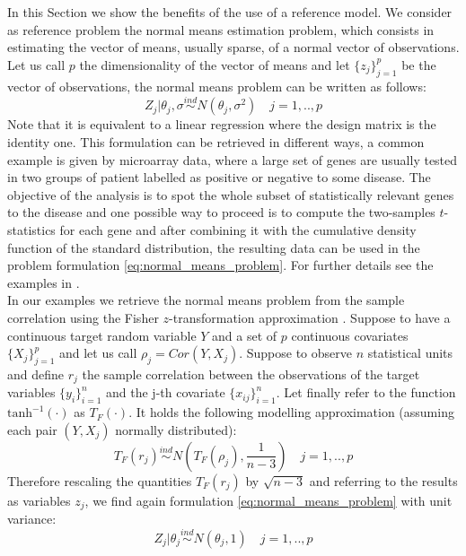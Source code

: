\documentclass[american,]{article}
\theoremstyle{definition}
\begin{document}
In this Section we show the benefits of the use of a reference model. We consider as reference problem the normal means estimation problem, which consists in estimating the vector of means, usually sparse, of a normal vector of observations. Let us call $p$ the dimensionality of the vector of means and let $\{z_{j}\}_{j=1}^{p}$ be the vector of observations, the normal means problem can be written as follows:
\
\begin{equation}\label{eq:normal_means_problem}
Z_{j}|\theta_{j},\sigma\overset{ind}{\sim}N(\theta_{j},\sigma^{2}) \quad j=1,..,p
\end{equation}
Note that it is equivalent to a linear regression where the design matrix is the identity one. This formulation can be retrieved in different ways, a common example is given by microarray data, where a large set of genes are usually tested in two groups of patient labelled as positive or negative to some disease. The objective of the analysis is to spot the whole subset of statistically relevant genes to the disease and one possible way to proceed is to compute the two-samples $t$-statistics for each gene and after combining it with the cumulative density function of the standard distribution, the resulting data can be used in the problem formulation \eqref{eq:normal_means_problem}. For further details see the examples in \cite{paper:efron, book:efron}. 
\\
In our examples we retrieve the normal means problem from the sample correlation using the Fisher $z$-transformation approximation \citep{paper:hawkins}. Suppose to have a continuous target random variable $Y$ and a set of $p$ continuous covariates $\{X_{j}\}_{j=1}^{p}$ and let us call $\rho_{j}=Cor(Y,X_{j})$. Suppose to observe $n$ statistical units and define $r_{j}$ the sample correlation between the observations of the target variables $\{y_{i}\}_{i=1}^{n}$ and the j-th covariate $\{x_{ij}\}_{i=1}^{n}$. Let finally refer to the function $\text{tanh}^{-1}(\cdot)$ as $T_{F}(\cdot)$. It holds the following modelling approximation (assuming each pair $(Y,X_{j})$ normally distributed):
\
\begin{equation}
T_{F}(r_{j})\overset{ind}{\sim} N(T_{F}(\rho_{j}),\frac{1}{n-3}) \quad j=1,..,p
\end{equation}
Therefore rescaling the quantities $T_{F}(r_{j})$ by $\sqrt{n-3}$ and referring to the results as variables $z_{j}$, we find again formulation \eqref{eq:normal_means_problem} with unit variance:
\
\begin{equation} \label{eq:normal_means_problem2}
Z_{j}|\theta_{j}\overset{ind}{\sim}N(\theta_{j},1) \quad j=1,..,p
\end{equation}
\end{document}
